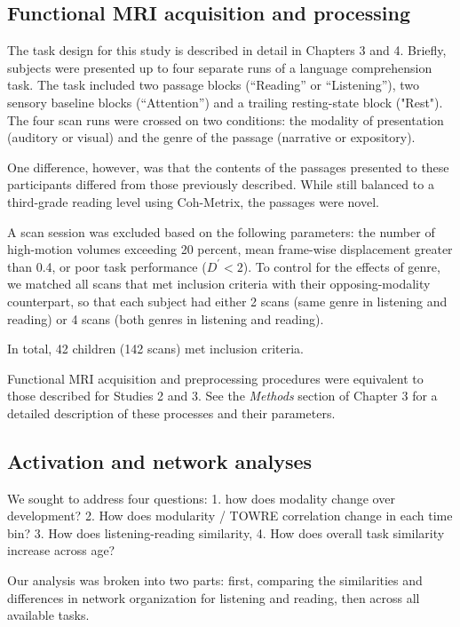 \subsection{Functional MRI acquisition and processing}

The task design for this study is described in detail in Chapters 3 and 4. Briefly, subjects were presented up to four separate runs of a language comprehension task. The task included two passage blocks (``Reading'' or ``Listening''), two sensory baseline blocks (``Attention'') and a trailing resting-state block ("Rest"). The four scan runs were crossed on two conditions: the modality of presentation (auditory or visual) and the genre of the passage (narrative or expository). 

One difference, however, was that the contents of the passages presented to these participants differed from those previously described. While still balanced to a third-grade reading level using Coh-Metrix, the passages were novel. 

A scan session was excluded based on the following parameters: the number of high-motion volumes exceeding 20 percent, mean frame-wise displacement greater than 0.4, or poor task performance ($D^\prime < 2$). To control for the effects of genre, we matched all scans that met inclusion criteria with their opposing-modality counterpart, so that each subject had either 2 scans (same genre in listening and reading) or 4 scans (both genres in listening and reading). 

In total, 42 children (142 scans) met inclusion criteria.

Functional MRI acquisition and preprocessing procedures were equivalent to those described for Studies 2 and 3. See the \textit{Methods} section of Chapter 3 for a detailed description of these processes and their parameters.


\subsection{Activation and network analyses}

We sought to address four questions:
1. how does modality change over development?
2. How does modularity / TOWRE correlation change in each time bin?
3. How does listening-reading similarity, 
4. How does overall task similarity increase across age?

Our analysis was broken into two parts: first, comparing the similarities and differences in network organization for listening and reading, then across all available tasks. 

